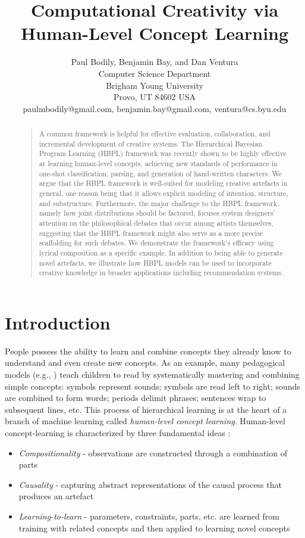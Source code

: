 \documentclass[letterpaper]{article}
\title{Computational Creativity via Human-Level Concept Learning}
\author{Paul Bodily, Benjamin Bay, and Dan Ventura\\
Computer Science Department\\
Brigham Young University\\
Provo, UT 84602  USA\\
paulmbodily@gmail.com, benjamin.bay@gmail.com, ventura@cs.byu.edu\\
}
\begin{document}
 
\maketitle
\begin{abstract}
\begin{quote}
A common framework is helpful for effective evaluation, collaboration, and incremental development of creative systems. The Hierarchical Bayesian Program Learning (HBPL) framework was recently shown to be highly effective at learning human-level concepts, achieving new standards of performance in one-shot classification, parsing, and generation of hand-written characters. We argue that the HBPL framework is well-suited for modeling creative artefacts in general, one reason being that it allows explicit modeling of intention, structure, and substructure. Furthermore, the major challenge to the HBPL framework, namely how joint distributions should be factored, focuses system designers' attention on the philosophical debates that occur among artists themselves, suggesting that the HBPL framework might also serve as a more precise scaffolding for such debates. We demonstrate the framework's efficacy using lyrical composition as a specific example. In addition to being able to generate novel artefacts, we illustrate how HBPL models can be used to incorporate creative knowledge in broader applications including recommendation systems.
\end{quote}
\end{abstract}

\section{Introduction}

People possess the ability to learn and combine concepts they already know to understand and even create new concepts. As an example, many pedagogical models (e.g., \cite{englemann1974distar}) teach children to read by systematically mastering and combining simple concepts: symbols represent sounds; symbols are read left to right; sounds are combined to form words; periods delimit phrases; sentences wrap to subsequent lines, etc. This process of hierarchical learning is at the heart of a branch of machine learning called \textit{human-level concept learning}. Human-level concept-learning is characterized by three fundamental ideas \cite{lake2015human}:

\begin{itemize}  
\item \emph{Compositionality} - observations are constructed through a combination of parts
\item \emph{Causality} - capturing abstract representations of the causal process that produces an artefact
\item \emph{Learning-to-learn} - parameters, constraints, parts, etc. are learned from training with related concepts and then applied to learning novel concepts
\end{itemize}
\end{document}
